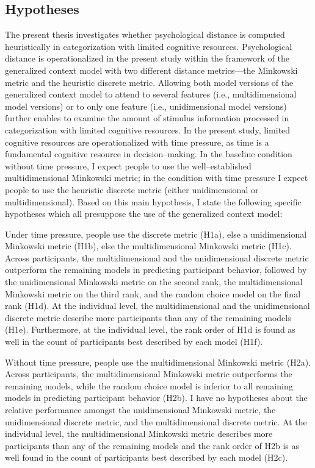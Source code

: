 \documentclass[a4paper,man,natbib]{apa6}
\begin{document}
\subsection{Hypotheses}
The present thesis investigates whether psychological distance is computed heuristically in categorization with limited cognitive resources. Psychological distance is operationalized in the present study within the framework of the generalized context model \citep{nosofsky1989further} with two different distance metrics---the Minkowski metric and the heuristic discrete metric. Allowing both model versions of the generalized context model to attend to several features (i.e., multidimensional model versions) or to only one feature (i.e., unidimensional model versions) further enables to examine the amount of stimulus information processed in categorization with limited cognitive resources. In the present study, limited cognitive resources are operationalized with time pressure, as time is a fundamental cognitive resource in decision--making. In the baseline condition without time pressure, I expect people to use the well--established multidimensional Minkowski metric; in the condition with time pressure I expect people to use the heuristic discrete metric (either unidimensional or multidimensional). Based on this main hypothesis, I state the following specific hypotheses which all presuppose the use of the generalized context model: 

Under time pressure, people use the discrete metric (H1a), else a unidimensional Minkowski metric (H1b), else the multidimensional Minkowski metric (H1c). Across participants, the multidimensional and the unidimensional discrete metric outperform the remaining models in predicting participant behavior, followed by the unidimensional Minkowski metric on the second rank, the multidimensional Minkowski metric on the third rank, and the random choice model on the final rank (H1d). At the individual level, the multidimensional and the unidimensional discrete metric describe more participants than any of the remaining models (H1e). Furthermore, at the individual level, the rank order of H1d is found as well in the count of participants best described by each model (H1f). 

Without time pressure, people use the multidimensional Minkowski metric (H2a). Across participants, the multidimensional Minkowski metric outperforms the remaining models, while the random choice model is inferior to all remaining models in predicting participant behavior (H2b). I have no hypotheses about the relative performance amongst the unidimensional Minkowski metric, the unidimensional discrete metric, and the multidimensional discrete metric. At the individual level, the multidimensional Minkowski metric describes more participants than any of the remaining models and the rank order of H2b is as well found in the count of participants best described by each model (H2c). 
\end{document}
